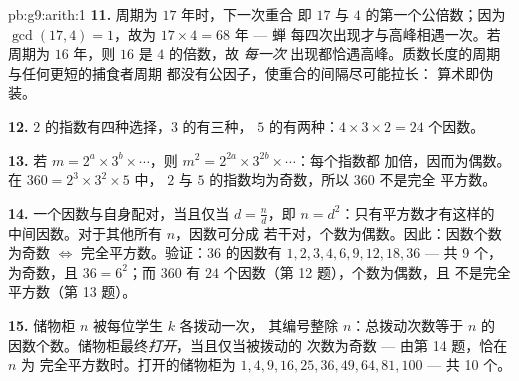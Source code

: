 \begin{solution}{pb:g9:arith:1}
\textbf{11.} 周期为 $17$ 年时，下一次重合
即 $17$ 与 $4$ 的第一个公倍数；因为
$\gcd(17, 4) = 1$，故为 $17 \times 4 = 68$ 年 --- 蝉
每四次出现才与高峰相遇一次。若周期为
$16$ 年，则 $16$ 是 $4$ 的倍数，故 \emph{每一次}
出现都恰遇高峰。质数长度的周期与任何更短的捕食者周期
都没有公因子，使重合的间隔尽可能拉长：
算术即伪装。

\textbf{12.} $2$ 的指数有四种选择，$3$ 的有三种，
$5$ 的有两种：$4 \times 3 \times 2 = 24$ 个因数。

\textbf{13.} 若 $m = 2^{a} \times 3^{b} \times \cdots$，则
$m^2 = 2^{2a} \times 3^{2b} \times \cdots$：每个指数都
加倍，因而为偶数。在 $360 = 2^3 \times 3^2 \times 5$ 中，
$2$ 与 $5$ 的指数均为奇数，所以 $360$ 不是完全
平方数。

\textbf{14.} 一个因数与自身配对，当且仅当
$d = \frac nd$，即 $n = d^2$：只有平方数才有这样的
中间因数。对于其他所有 $n$，因数可分成
若干对，个数为偶数。因此：因数个数为奇数
$\Leftrightarrow$ 完全平方数。验证：$36$ 的因数有
$1, 2, 3, 4, 6, 9, 12, 18, 36$ --- 共 9 个，为奇数，且
$36 = 6^2$；而 $360$ 有 $24$ 个因数（第 12 题），个数为偶数，且
不是完全平方数（第 13 题）。

\textbf{15.} 储物柜 $n$ 被每位学生 $k$ 各拨动一次，
其编号整除 $n$：总拨动次数等于 $n$ 的
因数个数。储物柜最终\emph{打开}，当且仅当被拨动的
次数为奇数 --- 由第 14 题，恰在 $n$ 为
完全平方数时。打开的储物柜为 $1, 4, 9, 16, 25, 36, 49, 64,
81, 100$ --- 共 10 个。
\end{solution}
